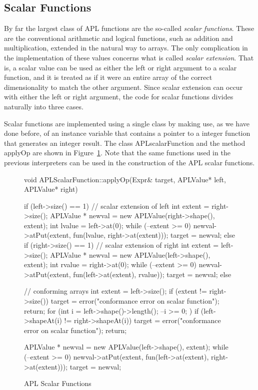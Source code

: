 \subsection{Scalar Functions}

By far the largest class of APL functions are the so-called {\em scalar
functions}.  These are the conventional arithmetic and logical functions,
such as addition and multiplication, extended in the natural way to arrays.
The only complication in the implementation of these values concerns what
is called {\em scalar extension}.  That is, a scalar value can be used as
either the left or right argument to a scalar function, and it is treated
as if it were an entire array of the correct dimensionality to match the
other argument.  Since scalar extension can occur with either the left or
right argument, the code for scalar functions divides naturally into three
cases.

Scalar functions are implemented using a single class by making use, as we
have done before, of an instance variable that contains a pointer to 
a integer function that generates an integer result.  The class {\sf
APLscalarFunction} and the method {\sf applyOp} are shown in
Figure~\ref{aplscalar}.  Note that the same functions used in the previous
interpreters can be used in the construction of the APL scalar functions.

\begin{figure}
\begin{cprog}
void APLScalarFunction::applyOp(Expr& target, APLValue* left, APLValue* right)
{
	if (left->size() == 1) {	// scalar extension of left
		int extent = right->size();
		APLValue * newval = new APLValue(right->shape(), extent);
		int lvalue = left->at(0);
		while (--extent >= 0)
			newval->atPut(extent, fun(lvalue, right->at(extent)));
		target = newval;
		}
	else if (right->size() == 1) {	// scalar extension of right
		int extent = left->size();
		APLValue * newval = new APLValue(left->shape(), extent);
		int rvalue = right->at(0);
		while (--extent >= 0)
			newval->atPut(extent, fun(left->at(extent), rvalue));
		target = newval;
		}
	else {				// conforming arrays
		int extent = left->size();
		if (extent != right->size()) {
			target = error("conformance error on scalar function");
			return;
			}
		for (int i = left->shape()->length(); --i >= 0; ) 
			if (left->shapeAt(i) != right->shapeAt(i)) {
				target = 
				error("conformance error on scalar function");
				return;
				}

		APLValue * newval = new APLValue(left->shape(), extent);
		while (--extent >= 0)
			newval->atPut(extent, 
				fun(left->at(extent), right->at(extent)));
		target = newval;
		}
}
\end{cprog}
\caption{APL Scalar Functions}\label{aplscalar}
\end{figure}

